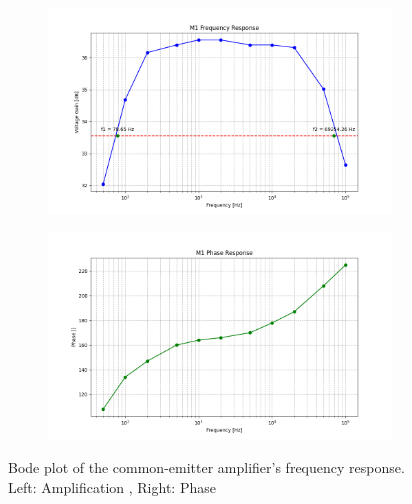 \documentclass[12pt,a4paper]{article}
\begin{document}



\begin{figure}[H]
    \centering
    \begin{subfigure}[b]{0.48\linewidth}
        \centering
        \includegraphics[width=\linewidth]{m1_frequency_response.png}
    \end{subfigure}\hfill
    \begin{subfigure}[b]{0.48\linewidth}
        \centering
        \includegraphics[width=\linewidth]{m1_phase_response.png}
    \end{subfigure}
    \caption{Bode plot of the common-emitter amplifier's frequency response. Left: Amplification , Right: Phase}
    \label{fig:bode_plot_m1}
\end{figure}
\end{document}
